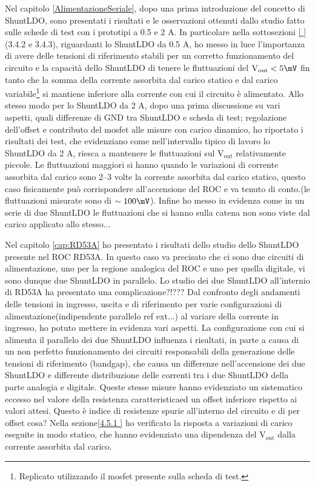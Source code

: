 Nel capitolo \ref{AlimentazioneSeriale}, dopo una prima introduzione del concetto di ShuntLDO, sono presentati i risultati e le osservazioni ottenuti dallo studio fatto sulle schede di test con i prototipi a 0.5 e 2 A. 
In particolare nella sottosezioni \ref{ }(3.4.2 e 3.4.3), riguardanti lo ShuntLDO da 0.5 A, ho messo in luce l'importanza di avere delle tensioni di riferimento stabili per un corretto funzionamento del circuito e la capacità dello ShuntLDO di tenere le fluttuazioni del $\mathrm{V_{out}<5 \mV}$ fin tanto che la somma della corrente assorbita dal carico statico e dal carico variabile\footnote{Replicato utilizzando il mosfet presente sulla scheda di test.} si mantiene inferiore alla corrente con cui il circuito è alimentato. 
Allo stesso modo per lo ShuntLDO da 2 A, dopo una prima discussione su vari aspetti, quali differenze di GND tra ShuntLDO e scheda di test; regolazione dell'offset e contributo del mosfet alle misure con carico dinamico, ho riportato i risultati dei test, che evidenziano come nell'intervallo tipico di lavoro lo ShuntLDO da 2 A, riesca a mantenere le fluttuazioni sul $\mathrm{V_{out}}$ relativamente piccole. 
Le fluttuazioni maggiori si hanno quando le variazioni di corrente assorbita dal carico sono 2--3 volte la corrente assorbita dal carico statico, questo caso fisicamente può corrispondere all'accensione del ROC e va tenuto di conto.(le fluttuazioni misurate sono di $\sim 100 \mV$). 
Infine ho messo in evidenza come in un serie di due ShuntLDO le fluttuazioni che si hanno sulla catena non sono viste dal carico applicato allo stesso...

Nel capitolo \ref{cap:RD53A} ho presentato i risultati dello studio dello ShuntLDO presente nel ROC RD53A. In questo caso va precisato che ci sono due circuiti di alimentazione, uno per la regione analogica del ROC e uno per quella digitale, vi sono dunque due ShuntLDO in parallelo. 
Lo studio dei due ShuntLDO all'internio di RD53A ha presentato una complicazione?!???
Dal confronto degli andamenti delle tensioni in ingresso, uscita e di riferimento per varie configurazioni di alimentazione(indipendente parallelo ref ext...) al variare della corrente in ingresso, ho potuto mettere in evidenza vari aspetti. 
La configurazione con cui si alimenta il parallelo dei due ShuntLDO influenza i risultati, in parte a causa di un non perfetto funzionamento dei circuiti responsabili della generazione delle tensioni di riferimento (bandgap), che causa un differenze nell'accensione dei due ShuntLDO e differente distribuzione delle correnti tra  i due ShuntLDO della parte analogia e digitale. 
Queste stesse misure hanno evidenziato un sistematico eccesso nel valore della resistenza caratteristicaed un offset inferiore  rispetto ai valori attesi. 
Questo è indice di resistenze spurie all'interno del circuito e di per offset cosa? 
Nella sezione\ref{4.5.1 } ho verificato la risposta a variazioni di carico eseguite in modo statico, che hanno evidenziato una dipendenza del $\mathrm{V_{out}}$ dalla corrente assorbita dal carico. 

